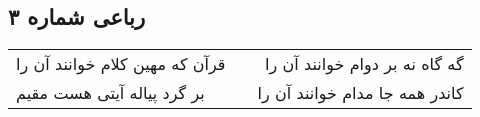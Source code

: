 \begin{center}
\section*{رباعی شماره ۳}
\label{sec:sh003}
\begin{longtable}{l p{0.5cm} r}
قرآن که مهین کلام خوانند آن را
&&
گه گاه نه بر دوام خوانند آن را
\\
بر گرد پیاله آیتی هست مقیم
&&
کاندر همه جا مدام خوانند آن را
\\
\end{longtable}
\end{center}
